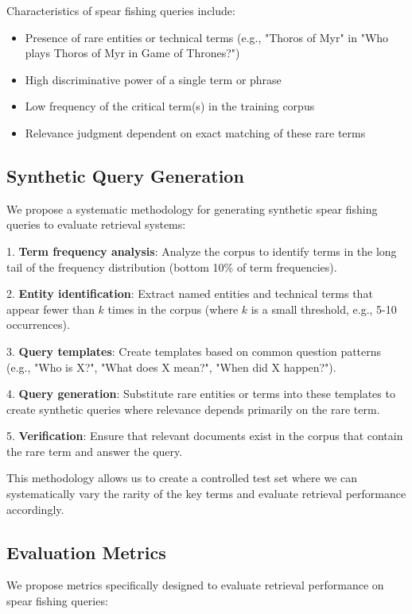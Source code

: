 \documentclass[sigconf,review]{acmart}
\begin{document}
Characteristics of spear fishing queries include:
\begin{itemize}
\item Presence of rare entities or technical terms (e.g., "Thoros of Myr" in "Who plays Thoros of Myr in Game of Thrones?")
\item High discriminative power of a single term or phrase
\item Low frequency of the critical term(s) in the training corpus
\item Relevance judgment dependent on exact matching of these rare terms
\end{itemize}

\subsection{Synthetic Query Generation}
We propose a systematic methodology for generating synthetic spear fishing queries to evaluate retrieval systems:

1. \textbf{Term frequency analysis}: Analyze the corpus to identify terms in the long tail of the frequency distribution (bottom 10\% of term frequencies).

2. \textbf{Entity identification}: Extract named entities and technical terms that appear fewer than $k$ times in the corpus (where $k$ is a small threshold, e.g., 5-10 occurrences).

3. \textbf{Query templates}: Create templates based on common question patterns (e.g., "Who is X?", "What does X mean?", "When did X happen?").

4. \textbf{Query generation}: Substitute rare entities or terms into these templates to create synthetic queries where relevance depends primarily on the rare term.

5. \textbf{Verification}: Ensure that relevant documents exist in the corpus that contain the rare term and answer the query.

This methodology allows us to create a controlled test set where we can systematically vary the rarity of the key terms and evaluate retrieval performance accordingly.

\subsection{Evaluation Metrics}
We propose metrics specifically designed to evaluate retrieval performance on spear fishing queries:
\end{document}
